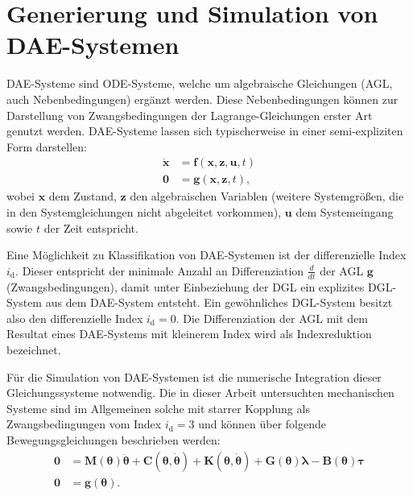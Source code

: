 \section{Generierung und Simulation von DAE-Systemen}
DAE-Systeme sind ODE-Systeme, welche um algebraische Gleichungen (AGL, auch Nebenbedingungen) ergänzt werden. Diese Nebenbedingungen können zur Darstellung von Zwangsbedingungen der Lagrange-Gleichungen erster Art genutzt werden. DAE-Systeme lassen sich typischerweise in einer semi-expliziten Form darstellen:
	\begin{align}\label{eq:dae_std}
		\mathbf{\dot{x}} &= \mathbf{f}(\mathbf{x}, \mathbf{z}, \mathbf{u}, t) \\
		\mathbf{0} &= \mathbf{g}(\mathbf{x}, \mathbf{z}, t),
	\end{align}
wobei $\mathbf{x}$ dem Zustand, $\mathbf{z}$ den algebraischen Variablen (weitere Systemgrößen, die in den Systemgleichungen nicht abgeleitet vorkommen), $\mathbf{u}$ dem Systemeingang sowie $t$ der Zeit entspricht. \cite[S.137]{JanschekSystementwurf}

Eine Möglichkeit zu Klassifikation von DAE-Systemen ist der differenzielle Index $i_\mathrm{d}$. Dieser entspricht der minimale Anzahl an Differenziation $\frac{d}{dt}$ der AGL $\mathbf{g}$ (Zwangsbedingungen), damit unter Einbeziehung der DGL ein explizites DGL-System aus dem DAE-System entsteht. Ein gewöhnliches DGL-System besitzt also den differenzielle Index $i_\mathrm{d} = 0$. Die Differenziation der AGL mit dem Resultat eines DAE-Systems mit kleinerem Index wird als Indexreduktion bezeichnet. \cite[S.139]{JanschekSystementwurf}

Für die Simulation von DAE-Systemen ist die numerische Integration dieser Gleichungssysteme notwendig. Die in dieser Arbeit untersuchten mechanischen Systeme sind im Allgemeinen solche mit starrer Kopplung als Zwangsbedingungen vom Index $i_\mathrm{d} = 3$ und können über folgende Bewegungsgleichungen beschrieben werden:
\begin{align}
\mathbf{0} &= \mathbf{M}(\mathbf{\theta}) \ddot{\mathbf{\theta}} + \mathbf{C}(\mathbf{\theta}, \dot{\mathbf{\theta}}) + \mathbf{K}(\mathbf{\theta}, \dot{\mathbf{\theta}}) + \mathbf{G}(\mathbf{\theta}) \mathbf{\lambda} - \mathbf{B}(\mathbf{\theta}) \mathbf{\tau} \label{eq:implicit_mechanical_system}\\
\mathbf{0} &= \mathbf{g}(\mathbf{\theta}).
\end{align}

